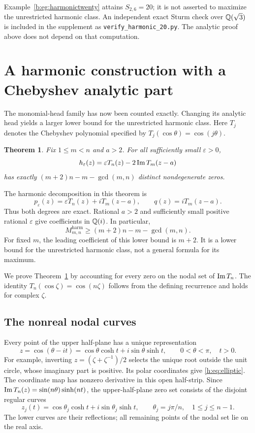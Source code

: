 \documentclass[UTF8,11pt]{ctexart}
\newtheorem{thm}{Theorem}[section]
\theoremstyle{definition}
\numberwithin{equation}{section}
\newcommand{\eps}{\varepsilon}\newcommand{\ep}{\varepsilon}
\begin{document}
Example~\ref{b:eg:harmonictwenty} attains $S_{2,6}=20$; it is not
asserted to maximize the unrestricted harmonic class.
An independent exact Sturm check over $\mathbb Q(\sqrt3)$ is included
in the supplement as \texttt{verify\_harmonic\_20.py}.
The analytic proof above does not depend on that computation.

\section{A harmonic construction with a Chebyshev analytic part}\label{h:sec:Cheb}
The monomial-head family has now been counted exactly. Changing its
analytic head yields a larger lower bound for the unrestricted harmonic
class. Here $T_j$ denotes the Chebyshev polynomial specified by
$T_j(\cos\theta)=\cos(j\theta)$.
\begin{thm}\label{h:thm:Cheb}
Fix $1\le m<n$ and $a>2$. For all sufficiently small $\eps>0$,
\begin{equation}\label{h:eq:Cheb}
 h_\eps(z)=\eps T_n(z)-2\Ima T_m(z-a)
\end{equation}
has exactly $(m+2)n-m-\gcd(m,n)$ distinct nondegenerate zeros.
\end{thm}

The harmonic decomposition in this theorem is
\[
 p_\eps(z)=\eps T_n(z)+iT_m(z-a),\qquad q(z)=iT_m(z-a).
\]
Thus both degrees are exact. Rational $a>2$ and sufficiently small positive
rational $\eps$ give coefficients in $\mathbb Q(i)$. In particular,
\begin{equation}\label{h:eq:harmoniclower}
 M^{\mathrm{harm}}_{m,n}\ge(m+2)n-m-\gcd(m,n).
\end{equation}
For fixed $m$, the leading coefficient of this lower bound is $m+2$.
It is a lower bound for the unrestricted harmonic class, not a general
formula for its maximum.


We prove Theorem~\ref{h:thm:Cheb} by accounting for every zero on the nodal
set of $\operatorname{Im} T_n$. The identity $T_n(\cos\zeta)=\cos(n\zeta)$ follows
from the defining recurrence and holds for complex $\zeta$.

\subsection{The nonreal nodal curves}
Every point of the upper half-plane has a unique representation
\begin{equation}\label{h:eq:elliptic}
 z=\cos(\theta-it)
 =\cos\theta\cosh t+i\sin\theta\sinh t,
 \qquad 0<\theta<\pi,\quad t>0.
\end{equation}
For example, inverting $z=(\zeta+\zeta^{-1})/2$ selects the unique root
outside the unit circle, whose imaginary part is positive. Its polar
coordinates give \eqref{h:eq:elliptic}. The coordinate map has nonzero
derivative in this open half-strip.
Since $\operatorname{Im} T_n(z)=\sin(n\theta)\sinh(nt)$, the upper-half-plane zero set
consists of the disjoint regular curves
\begin{equation}\label{h:eq:curves}
 z_j(t)=\cos\theta_j\cosh t+i\sin\theta_j\sinh t,
 \qquad \theta_j=j\pi/n,
 \quad 1\le j\le n-1.
\end{equation}
The lower curves are their reflections; all remaining points of the
nodal set lie on the real axis.
\end{document}
